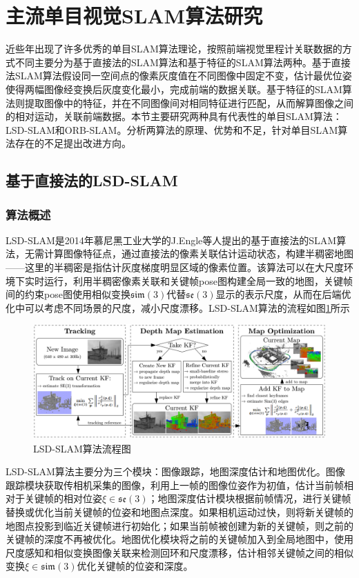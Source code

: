\section{主流单目视觉SLAM算法研究}
近些年出现了许多优秀的单目SLAM算法理论，按照前端视觉里程计关联数据的方式不同主要分为基于直接法的SLAM算法和基于特征的SLAM算法两种。基于直接法SLAM算法假设同一空间点的像素灰度值在不同图像中固定不变，估计最优位姿使得两幅图像经变换后灰度变化最小，完成前端的数据关联。基于特征的SLAM算法则提取图像中的特征，并在不同图像间对相同特征进行匹配，从而解算图像之间的相对运动，关联前端数据。本节主要研究两种具有代表性的单目SLAM算法：LSD-SLAM和ORB-SLAM。分析两算法的原理、优势和不足，针对单目SLAM算法存在的不足提出改进方向。

\subsection{基于直接法的LSD-SLAM}


\subsubsection*{算法概述}
LSD-SLAM是2014年慕尼黑工业大学的J.Engle等人提出的基于直接法的SLAM算法，无需计算图像特征点，通过直接法的像素关联估计运动状态，构建半稠密地图——这里的半稠密是指估计灰度梯度明显区域的像素位置。该算法可以在大尺度环境下实时运行，利用半稠密像素关联和关键帧pose图构建全局一致的地图，关键帧间的约束pose图使用相似变换$\mathfrak{sim}(3)$代替$\mathfrak{se}(3)$显示的表示尺度，从而在后端优化中可以考虑不同场景的尺度，减小尺度漂移。LSD-SLAM算法的流程如图\ref{fig3.4}所示
\begin{figure}
\centering
\includegraphics[scale=0.35]{figures/Fig3.4.png}
\caption{LSD-SLAM算法流程图\upcite{}}
\label{fig3.4}
\end{figure}

LSD-SLAM算法主要分为三个模块：图像跟踪，地图深度估计和地图优化。图像跟踪模块获取传相机采集的图像，利用上一帧的图像位姿作为初值，估计当前帧相对于关键帧的相对位姿$\xi \in \mathfrak{se}(3) $；地图深度估计模块根据前帧情况，进行关键帧替换或优化当前关键帧的位姿和地图点深度。如果相机运动过快，则将新关键帧的地图点投影到临近关键帧进行初始化；如果当前帧被创建为新的关键帧，则之前的关键帧的深度不再被优化。地图优化模块将之前的关键帧加入到全局地图中，使用尺度感知和相似变换图像关联来检测回环和尺度漂移，估计相邻关键帧之间的相似变换$\xi \in \mathfrak{sim}(3)$优化关键帧的位姿和深度。

